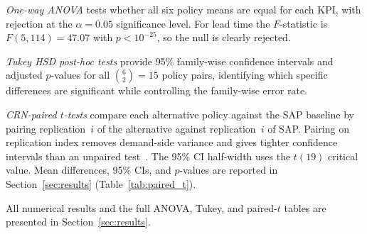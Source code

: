 \emph{One-way ANOVA} tests whether all six policy means are equal for each
KPI, with rejection at the $\alpha = 0.05$ significance level. For lead time the $F$-statistic is $F(5, 114) = 47.07$ with
$p < 10^{-25}$, so the null is clearly rejected.

\emph{Tukey HSD post-hoc tests} provide 95\% family-wise confidence intervals
and adjusted $p$-values for all $\binom{6}{2} = 15$ policy pairs, identifying
which specific differences are significant while controlling the family-wise
error rate.

\emph{CRN-paired $t$-tests} compare each alternative policy against the SAP
baseline by pairing replication~$i$ of the alternative against replication~$i$
of SAP. Pairing on replication index removes demand-side variance and gives
tighter confidence intervals than an unpaired test~\cite{law2015}. The 95\%
CI half-width uses the $t(19)$ critical value. Mean differences, 95\% CIs,
and $p$-values are reported in Section~\ref{sec:results}
(Table~\ref{tab:paired_t}).

All numerical results and the full ANOVA, Tukey, and paired-$t$ tables are
presented in Section~\ref{sec:results}.
